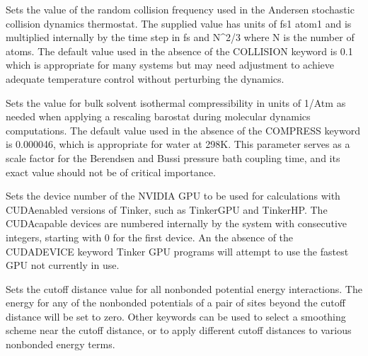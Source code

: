 \documentclass[letterpaper,11pt,english]{sphinxmanual}
\begin{document}
\ignorespaces {}\label{\detokenize{text/keywords:key-collision}}\begin{description}
\sphinxAtStartPar
Sets the value of the random collision frequency used in the Andersen stochastic collision dynamics thermostat. The supplied value has units of fs\sphinxhyphen{}1 atom\sphinxhyphen{}1 and is multiplied internally by the time step in fs and N\textasciicircum{}2/3 where N is the number of atoms. The default value used in the absence of the COLLISION keyword is 0.1 which is appropriate for many systems but may need adjustment to achieve adequate temperature control without perturbing the dynamics.

\end{description}

\ignorespaces {}\label{\detokenize{text/keywords:key-compress}}\begin{description}
\sphinxAtStartPar
Sets the value for bulk solvent isothermal compressibility in units of 1/Atm as needed when applying a rescaling barostat during molecular dynamics computations. The default value used in the absence of the COMPRESS keyword is 0.000046, which is appropriate for water at 298K. This parameter serves as a scale factor for the Berendsen and Bussi pressure bath coupling time, and its exact value should not be of critical importance.

\end{description}

\ignorespaces {}\label{\detokenize{text/keywords:key-cuda-device}}\begin{description}
\sphinxAtStartPar
Sets the device number of the NVIDIA GPU to be used for calculations with CUDA\sphinxhyphen{}enabled versions of Tinker, such as Tinker\sphinxhyphen{}GPU and Tinker\sphinxhyphen{}HP. The CUDA\sphinxhyphen{}capable devices are numbered internally by the system with consecutive integers, starting with 0 for the first device. An the absence of the CUDA\sphinxhyphen{}DEVICE keyword Tinker GPU programs will attempt to use the fastest GPU not currently in use.

\end{description}

\ignorespaces {}\label{\detokenize{text/keywords:key-cutoff}}\begin{description}
\sphinxAtStartPar
Sets the cutoff distance value for all nonbonded potential energy interactions. The energy for any of the nonbonded potentials of a pair of sites beyond the cutoff distance will be set to zero. Other keywords can be used to select a smoothing scheme near the cutoff distance, or to apply different cutoff distances to various nonbonded energy terms.

\end{description}
\end{document}
